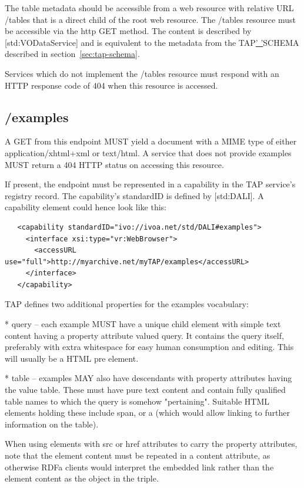 \documentclass[11pt,letter]{ivoa}
\begin{document}
The table metadata should be accessible from a web resource with relative URL 
/tables that is a direct child of the root web resource. The /tables resource 
must be accessible via the http GET method. The content is described by 
[std:VODataService] and is equivalent to the metadata from the 
TAP\underline{' '}SCHEMA described in section~\ref{sec:tap-schema}.

Services which do not implement the /tables resource must respond with an HTTP 
response code of 404 when this resource is accessed.

\subsection{/examples}
\label{sec:dali-examples}

A GET from this endpoint MUST yield a document with a MIME type of either 
application/xhtml+xml or text/html. A service that does not provide examples 
MUST return a 404 HTTP status on accessing this resource.

If present, the endpoint must be represented in a capability in the TAP 
service's registry record. The capability's standardID is defined by 
[std:DALI]. A capability element could hence look like this:

\begin{verbatim}
   <capability standardID="ivo://ivoa.net/std/DALI#examples">
     <interface xsi:type="vr:WebBrowser">
       <accessURL use="full">http://myarchive.net/myTAP/examples</accessURL>
     </interface>
   </capability>
\end{verbatim}

TAP defines two additional properties for the examples vocabulary:

* query -- each example MUST have a unique child element with simple text 
content having a property attribute valued query. It contains the query itself, 
preferably with extra whitespace for easy human consumption and editing. This 
will usually be a HTML pre element.
    
* table -- examples MAY also have descendants with property attributes having 
the value table. These must have pure text content and contain fully qualified 
table names to which the query is somehow "pertaining". Suitable HTML elements 
holding these include span, or a (which would allow linking to further 
information on the table).

When using elements with src or href attributes to carry the property 
attributes, note that the element content must be repeated in a content 
attribute, as otherwise RDFa clients would interpret the embedded link rather 
than the element content as the object in the triple.
\end{document}
